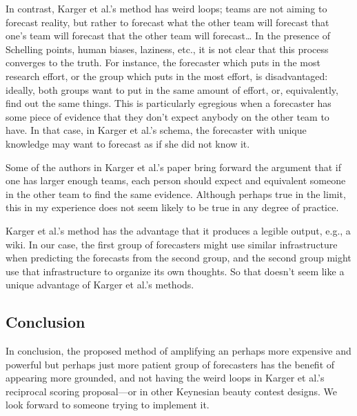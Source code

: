 \documentclass[]{article}
\begin{document}
In contrast, Karger et al.'s method has weird loops; teams are not
aiming to forecast reality, but rather to forecast what the other team
will forecast that one's team will forecast that the other team will
forecast\ldots{} In the presence of Schelling points, human biases,
laziness, etc., it is not clear that this process converges to the
truth. For instance, the forecaster which puts in the most research
effort, or the group which puts in the most effort, is disadvantaged:
ideally, both groups want to put in the same amount of effort, or,
equivalently, find out the same things. This is particularly egregious
when a forecaster has some piece of evidence that they don't expect
anybody on the other team to have. In that case, in Karger et al.'s
schema, the forecaster with unique knowledge may want to forecast as if
she did not know it.

Some of the authors in Karger et al.'s paper bring forward the argument
that if one has larger enough teams, each person should expect and
equivalent someone in the other team to find the same evidence. Although
perhaps true in the limit, this in my experience does not seem likely to
be true in any degree of practice.

Karger et al.'s method has the advantage that it produces a legible
output, e.g., a wiki. In our case, the first group of forecasters might
use similar infrastructure when predicting the forecasts from the second
group, and the second group might use that infrastructure to organize
its own thoughts. So that doesn't seem like a unique advantage of Karger
et al.'s methods.

\hypertarget{conclusion}{%
\subsection{Conclusion}\label{conclusion}}

In conclusion, the proposed method of amplifying an perhaps more
expensive and powerful but perhaps just more patient group of
forecasters has the benefit of appearing more grounded, and not having
the weird loops in Karger et al.'s reciprocal scoring proposal---or in
other Keynesian beauty contest designs. We look forward to someone
trying to implement it.
\end{document}
